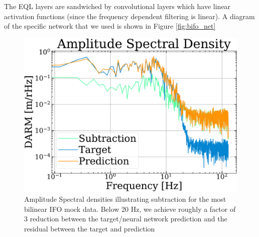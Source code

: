\begin{refsection}
The EQL layers are sandwiched by convolutional layers which have linear activation functions (since the frequency dependent filtering is linear).
A diagram of the specific network that we used is shown in Figure \ref{fig:bifo_net}

\begin{figure}[htbp]
   \centering
   \includegraphics[width=\columnwidth]{chapter_noise_sub/etc/ASD}
   \caption[ASD]{Amplitude Spectral densities illustrating subtraction for the most bilinear IFO mock data. Below 20 Hz, we achieve roughly a factor of 3 reduction between the target/neural network prediction and the residual between the target and prediction}
   \label{fig:ASD}
\end{figure}


\end{refsection}
